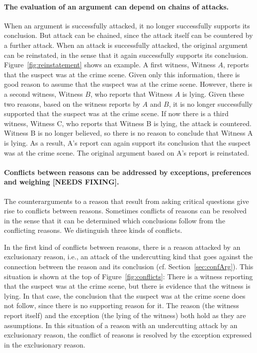 \documentclass[10pt]{article}
\begin{document}
\paragraph{The evaluation of an argument can depend on chains of attacks.} When an argument is successfully attacked, it no longer successfully supports its conclusion. But attack can be chained, since the attack itself can be countered by a further attack. When an attack is successfully attacked, the original argument can be reinstated, in the sense that it again successfully supports its conclusion. Figure~\ref{fig:reinstatement} shows an example. A first witness, Witness $A$, reports that the suspect was at the crime scene. Given only this information, there is good reason to assume that the suspect was at the crime scene. However, there is a second witness, Witness $B$, who reports that Witness $A$ is lying. Given these two reasons, based on the witness reports by $A$ and $B$, it is no longer successfully supported that the suspect was at the crime scene. If now there is a third witness, Witness C, who reports that Witness B is lying, the attack is countered. Witness B is no longer believed, so there is no reason to conclude that Witness A is lying. As a result, A's report can again support its conclusion that the suspect was at the crime scene. The original argument based on A's report is reinstated. 

\paragraph{Conflicts between reasons can be addressed by exceptions, preferences and weighing [NEEDS FIXING].} The counterarguments to a reason that result from asking critical questions give rise to conflicts between reasons. Sometimes conflicts of reasons can be resolved in the sense that it can be determined which conclusions follow from the conflicting reasons. We distinguish three kinds of conflicts. 

In the first kind of conflicts between reasons, there is a reason attacked by an exclusionary reason, i.e., an attack of the undercutting kind that goes against the connection between the reason and its conclusion (cf. Section~\ref{sec:confArg}). This situation is shown at the top of Figure~\ref{fig:conflicts}: There is a witness reporting that the suspect was at the crime scene, but there is evidence that the witness is lying. 
In that case, the conclusion that the suspect was at the crime scene does not follow, since there is no supporting reason for it. The reason (the witness report itself) and the exception (the lying of the witness) both hold as they are assumptions. %
In this situation of a reason with an undercutting attack by an exclusionary reason, the conflict of reasons is resolved by the exception expressed in the exclusionary reason. 
\end{document}

